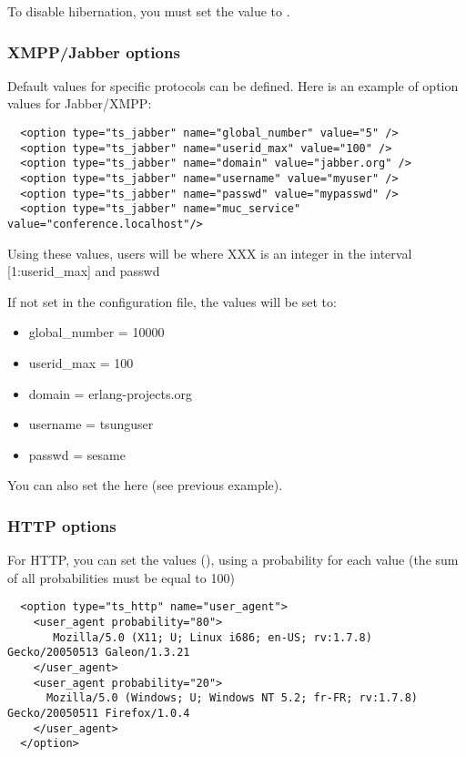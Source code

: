 \documentclass{TSUNG-en}
\begin{document}
To disable hibernation, you must set the value to .

\subsubsection{XMPP/Jabber options}
\label{sec:jabber-options}

Default values for specific protocols can be defined. Here is an
example of option values for Jabber/XMPP:

\begin{Verbatim}
  <option type="ts_jabber" name="global_number" value="5" />
  <option type="ts_jabber" name="userid_max" value="100" />
  <option type="ts_jabber" name="domain" value="jabber.org" />
  <option type="ts_jabber" name="username" value="myuser" />
  <option type="ts_jabber" name="passwd" value="mypasswd" />
  <option type="ts_jabber" name="muc_service" value="conference.localhost"/>
\end{Verbatim}

Using these values, users will be  where XXX is an integer in
the interval [1:userid\_max] and passwd  

If not set in the configuration file, the values will be set to:
\begin{itemize}
\item global\_number = 10000
\item userid\_max    = 100
\item domain   = erlang-projects.org
\item username = tsunguser
\item passwd   = sesame
\end{itemize}

You can also set the  here (see previous example).

\subsubsection{HTTP options}

For HTTP, you can set the  values
(), using a probability for each
value (the sum of all probabilities must be equal to 100)

\begin{Verbatim}
  <option type="ts_http" name="user_agent">
    <user_agent probability="80">
       Mozilla/5.0 (X11; U; Linux i686; en-US; rv:1.7.8) Gecko/20050513 Galeon/1.3.21
    </user_agent>
    <user_agent probability="20">
      Mozilla/5.0 (Windows; U; Windows NT 5.2; fr-FR; rv:1.7.8) Gecko/20050511 Firefox/1.0.4
    </user_agent>
  </option>
\end{Verbatim}
\end{document}
